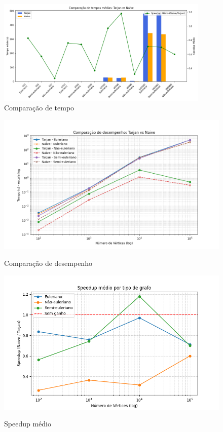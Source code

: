 \documentclass[12pt]{article}
\begin{document}
\begin{figure}[H]
    \centering
    \includegraphics[width=0.9\textwidth]{Figure_1.png}
    \caption{Comparação de tempo}
    \label{fig:Fig1}
\end{figure}

\begin{figure}[H]
    \centering
    \includegraphics[width=1\textwidth]{Figure_2.png}
    \label{fig:Fig2}
    \caption{Comparação de desempenho}
\end{figure}

\begin{figure}[H]
    \centering
    \includegraphics[width=1\textwidth]{Figure_3.png}
    \label{fig:Fig3}
    \caption{Speedup médio}
\end{figure}
\end{document}
